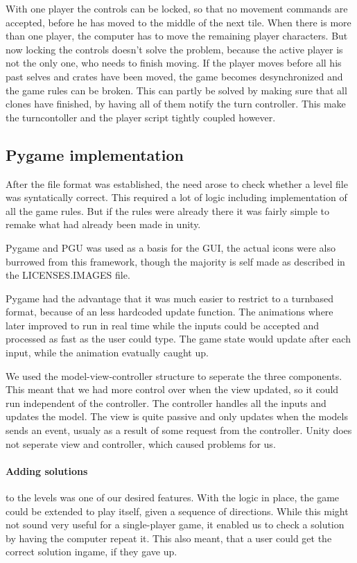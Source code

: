 With one player the controls can be locked, so that no movement commands
are accepted, before he has moved to the middle of the next tile. When
there is more than one player, the computer has to move the remaining player
characters. But now locking the controls doesn't solve the problem,
because the active player is not the only one, who needs to finish
moving. If the player moves before all his past selves and crates have
been moved, the game becomes desynchronized and the game rules can be
broken. This can partly be solved by making sure that all clones have
finished, by having all of them notify the turn controller. This make
the turncontoller and the player script tightly coupled however.

\subsection{Pygame implementation}
After the file format was established, the need arose to check whether
a level file was syntatically correct. This required a lot of logic including
implementation of all the game rules. But if the rules were already there
it was fairly simple to remake what had already been made in unity.

Pygame and PGU was used as a basis for the GUI, the actual icons were
also burrowed from this framework, though the majority is self made as
described in the LICENSES.IMAGES file.

Pygame had the advantage that it was much easier to restrict to a
turnbased format, because of an less hardcoded update function. The
animations where later improved to run in real time while the inputs could 
be accepted and processed as fast as the user could type. The game state
would update after each input, while the animation evatually caught up.

We used the model-view-controller structure to seperate the three
components. This meant that we had more control over when the view
updated, so it could run independent of the controller. The controller
handles all the inputs and updates the model. The view is quite passive
and only updates when the models sends an event, usualy as a result
 of some request from the controller. Unity does not seperate view
 and controller, which caused problems for us.

\paragraph{Adding solutions}
to the levels was one of our desired features. With the logic in place,
the game could be extended to play itself, given a sequence of directions.
While this might not sound very useful for a single-player game, it enabled
us to check a solution by having the computer repeat it. This also meant,
that a user could get the correct solution ingame, if they gave up.

